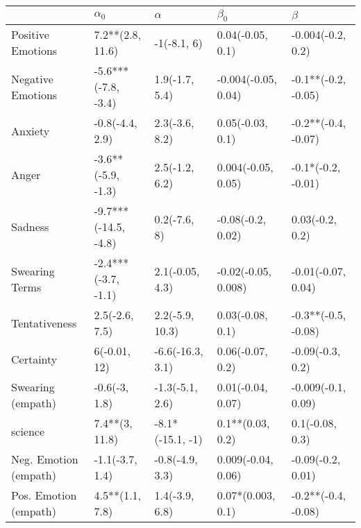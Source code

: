 \begin{tabular}{lllll}
\toprule
{} &            $\alpha_0$ &          $\alpha$ &            $\beta_0$ &              $\beta$ \\
\midrule
Positive Emotions     &      7.2**(2.8, 11.6) &       -1(-8.1, 6) &     0.04(-0.05, 0.1) &    -0.004(-0.2, 0.2) \\
Negative Emotions     &   -5.6***(-7.8, -3.4) &    1.9(-1.7, 5.4) &  -0.004(-0.05, 0.04) &  -0.1**(-0.2, -0.05) \\
Anxiety               &       -0.8(-4.4, 2.9) &    2.3(-3.6, 8.2) &     0.05(-0.03, 0.1) &  -0.2**(-0.4, -0.07) \\
Anger                 &    -3.6**(-5.9, -1.3) &    2.5(-1.2, 6.2) &   0.004(-0.05, 0.05) &   -0.1*(-0.2, -0.01) \\
Sadness               &  -9.7***(-14.5, -4.8) &      0.2(-7.6, 8) &    -0.08(-0.2, 0.02) &      0.03(-0.2, 0.2) \\
Swearing Terms        &   -2.4***(-3.7, -1.1) &   2.1(-0.05, 4.3) &  -0.02(-0.05, 0.008) &   -0.01(-0.07, 0.04) \\
Tentativeness         &        2.5(-2.6, 7.5) &   2.2(-5.9, 10.3) &     0.03(-0.08, 0.1) &  -0.3**(-0.5, -0.08) \\
Certainty             &          6(-0.01, 12) &  -6.6(-16.3, 3.1) &     0.06(-0.07, 0.2) &     -0.09(-0.3, 0.2) \\
Swearing (empath)     &         -0.6(-3, 1.8) &   -1.3(-5.1, 2.6) &    0.01(-0.04, 0.07) &   -0.009(-0.1, 0.09) \\
science               &        7.4**(3, 11.8) &  -8.1*(-15.1, -1) &     0.1**(0.03, 0.2) &      0.1(-0.08, 0.3) \\
Neg. Emotion (empath) &       -1.1(-3.7, 1.4) &   -0.8(-4.9, 3.3) &   0.009(-0.04, 0.06) &    -0.09(-0.2, 0.01) \\
Pos. Emotion (empath) &       4.5**(1.1, 7.8) &    1.4(-3.9, 6.8) &    0.07*(0.003, 0.1) &  -0.2**(-0.4, -0.08) \\
\bottomrule
\end{tabular}
